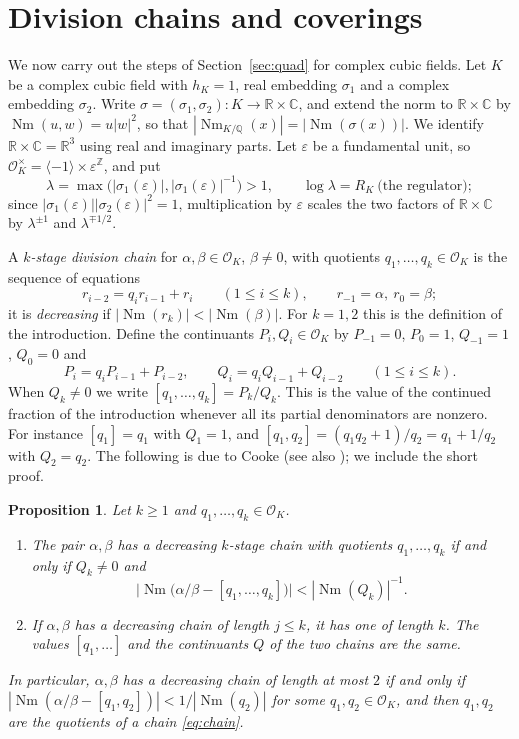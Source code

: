 \documentclass[11pt]{amsart}
\newtheorem{proposition}[theorem]{Proposition}
\theoremstyle{definition}
\theoremstyle{remark}
\numberwithin{equation}{section}
\newcommand{\Q}{\mathbb{Q}}
\newcommand{\Z}{\mathbb{Z}}
\newcommand{\R}{\mathbb{R}}
\newcommand{\C}{\mathbb{C}}
\newcommand{\cO}{\mathcal{O}}
\newcommand{\Nm}{\operatorname{Nm}}
\begin{document}
\section{Division chains and coverings}\label{sec:setting}

We now carry out the steps of Section~\ref{sec:quad} for complex cubic fields. Let $K$ be a
complex cubic field with $h_K=1$, real embedding $\sigma_1$ and a complex
embedding $\sigma_2$. Write $\sigma=(\sigma_1,\sigma_2)\colon K\to \R\times\C$, and extend the
norm to $\R\times\C$ by $\Nm(u,w)=u|w|^2$, so that $|\Nm_{K/\Q}(x)|=|\Nm(\sigma(x))|$. We
identify $\R\times\C=\R^3$ using real and imaginary parts. Let $\varepsilon$ be a fundamental
unit, so $\cO_K^\times=\langle-1\rangle\times\varepsilon^{\Z}$, and put
\[
  \lambda=\max\bigl(|\sigma_1(\varepsilon)|,|\sigma_1(\varepsilon)|^{-1}\bigr)>1,\qquad
  \log\lambda = R_K\ \text{(the regulator)};
\]
since $|\sigma_1(\varepsilon)||\sigma_2(\varepsilon)|^2=1$, multiplication by $\varepsilon$
scales the two factors of $\R\times\C$ by $\lambda^{\pm1}$ and $\lambda^{\mp1/2}$.

A \emph{$k$-stage division chain} for $\alpha,\beta\in\cO_K$, $\beta\ne0$, with quotients
$q_1,\dots,q_k\in\cO_K$ is the sequence of equations
\begin{equation}\label{eq:kchain}
  r_{i-2}=q_ir_{i-1}+r_i\qquad(1\le i\le k),\qquad r_{-1}=\alpha,\ r_0=\beta;
\end{equation}
it is \emph{decreasing} if $|\Nm(r_k)|<|\Nm(\beta)|$. For $k=1,2$ this is the definition of the
introduction. Define the continuants $P_i,Q_i\in\cO_K$ by $P_{-1}=0$, $P_0=1$, $Q_{-1}=1$,
$Q_0=0$ and
\[
  P_i=q_iP_{i-1}+P_{i-2},\qquad Q_i=q_iQ_{i-1}+Q_{i-2}\qquad(1\le i\le k).
\]
When $Q_k\ne0$ we write $[q_1,\dots,q_k]=P_k/Q_k$. This is the value of the continued fraction
of the introduction whenever all its partial denominators are nonzero. For instance
$[q_1]=q_1$ with $Q_1=1$, and $[q_1,q_2]=(q_1q_2+1)/q_2=q_1+1/q_2$ with $Q_2=q_2$. The
following is due to Cooke \cite{Co} (see also \cite[(0.8)--(0.9)]{Le2}); we include the short
proof.

\begin{proposition}\label{prop:cooke}
Let $k\ge1$ and $q_1,\dots,q_k\in\cO_K$.
\begin{enumerate}
\item[(i)] The pair $\alpha,\beta$ has a decreasing $k$-stage chain with quotients
$q_1,\dots,q_k$ if and only if $Q_k\ne0$ and
\[
  \bigl|\Nm\bigl(\alpha/\beta-[q_1,\dots,q_k]\bigr)\bigr|<|\Nm(Q_k)|^{-1}.
\]
\item[(ii)] If $\alpha,\beta$ has a decreasing chain of length $j\le k$, it has one of length
$k$. The values $[q_1,\dots]$ and the continuants $Q$ of the two chains are the same.
\end{enumerate}
In particular, $\alpha,\beta$ has a decreasing chain of length at most $2$ if and only if
$|\Nm(\alpha/\beta-[q_1,q_2])|<1/|\Nm(q_2)|$ for some $q_1,q_2\in\cO_K$, and then
$q_1,q_2$ are the quotients of a chain \eqref{eq:chain}.
\end{proposition}
\end{document}
